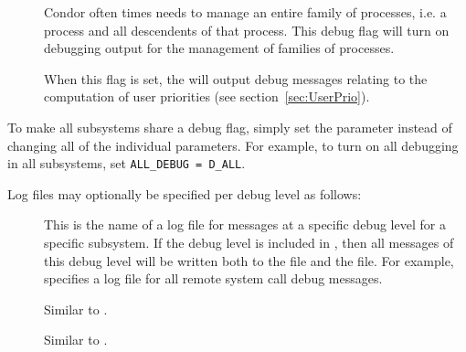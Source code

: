 \begin{description}
\begin{description}
\item[] \label{dflag:procfamily}
  Condor often times needs to manage an entire family of processes, i.e. a 
  process and all descendents of that process.  This debug flag will 
  turn on debugging output for the management of families of processes.

\item[] \label{dflag:accountant}
  When this flag is set,
  the  will output debug messages relating to the computation
  of user priorities (see section~\ref{sec:UserPrio}).
	
\end{description}

\item[\Macro{ALL\_DEBUG}] \label{param:AllDebug} To make all subsystems
  share a debug flag, simply set the parameter 
  instead of changing all of the individual parameters.  For example,
  to turn on all debugging in all subsystems, set
  \verb$ALL_DEBUG = D_ALL$.

\end{description}

Log files may optionally be specified per debug level as follows:
\begin{description}

\item[] \label{param:SubsysLevelLog} This is
  the name of a log file for messages at a specific debug level for a
  specific subsystem.  If the debug level is included in
  , then all messages of this debug level will be
  written both to the  file and the
   file.  For example,
   specifies a log file for all remote
  system call debug messages.

\item[] \label{param:MaxSubsysLevelLog}
  Similar to .

\item[]
  \label{param:TruncSubsysLevelLogOnOpen} Similar to
  .

\end{description}

